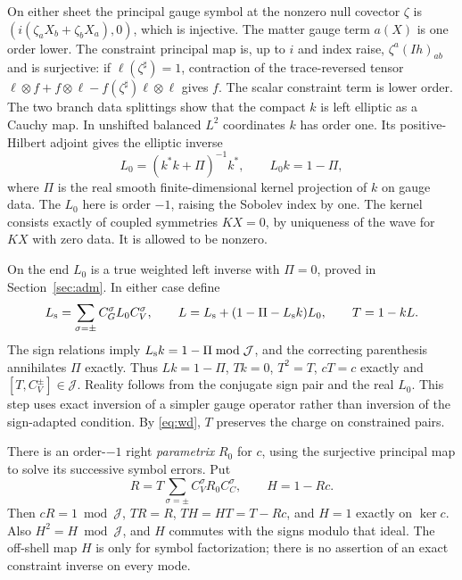 \documentclass[11pt]{article}
\newcommand{\Reg}{\mathcal J}
\begin{document}
On either sheet the principal gauge symbol at the nonzero null covector \(\zeta\) is \((i(\zeta_a X_b+\zeta_b X_a),0)\), which is injective. The matter gauge term \(a(X)\) is one order lower. The constraint principal map is, up to \(i\) and index raise, \(\zeta^a(Ih)_{ab}\) and is surjective: if \(\ell(\zeta^\sharp)=1\), contraction of the trace-reversed tensor \(\ell\otimes f+f\otimes\ell-f(\zeta^\sharp)\ell\otimes\ell\) gives \(f\). The scalar constraint term is lower order. The two branch data splittings show that the compact \(k\) is left elliptic as a Cauchy map. In unshifted balanced \(L^2\) coordinates \(k\) has order one. Its positive-Hilbert adjoint gives the elliptic inverse
\[
 L_0=(k^*k+\Pi)^{-1}k^*,\qquad L_0k=1-\Pi ,
\]
where \(\Pi\) is the real smooth finite-dimensional kernel projection of \(k\) on gauge data. The \(L_0\) here is order \(-1\), raising the Sobolev index by one. The kernel consists exactly of coupled symmetries \(KX=0\), by uniqueness of the wave for \(KX\) with zero data. It is allowed to be nonzero.

On the end \(L_0\) is a true weighted left inverse with \(\Pi=0\), proved in Section~\ref{sec:adm}. In either case define
\begin{equation}
 L_{\rm s}=\sum_{\sigma=\pm}C_G^\sigma L_0 C_V^\sigma,\qquad
 L=L_{\rm s}+(1-\Pi-L_{\rm s}k)L_0,\qquad T=1-kL.
 \label{eq:left}
\end{equation}
The sign relations imply \(L_{\rm s}k=1-\Pi\bmod\Reg\), and the correcting parenthesis annihilates \(\Pi\) exactly. Thus \(Lk=1-\Pi\), \(Tk=0\), \(T^2=T\), \(cT=c\) exactly and \([T,C_V^\pm]\in\Reg\). Reality follows from the conjugate sign pair and the real \(L_0\). This step uses exact inversion of a simpler gauge operator rather than inversion of the sign-adapted condition. By \eqref{eq:wd}, \(T\) preserves the charge on constrained pairs.

There is an order-\(-1\) right \emph{parametrix} \(R_0\) for \(c\), using the surjective principal map to solve its successive symbol errors. Put
\begin{equation}
 R=T\sum_{\sigma=\pm} C_V^\sigma R_0 C_C^\sigma,\qquad H=1-Rc .
 \label{eq:right}
\end{equation}
Then \(cR=1\bmod\Reg\), \(TR=R\), \(TH=HT=T-Rc\), and \(H=1\) exactly on \(\ker c\). Also \(H^2=H\bmod\Reg\), and \(H\) commutes with the signs modulo that ideal. The off-shell map \(H\) is only for symbol factorization; there is no assertion of an exact constraint inverse on every mode.
\end{document}
